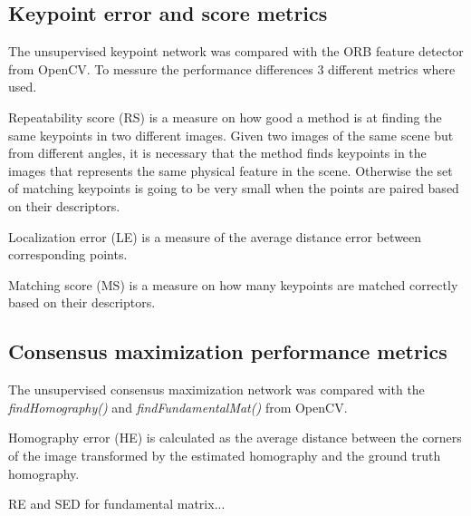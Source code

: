 \subsection{Keypoint error and score metrics}

The unsupervised keypoint network was compared with the ORB feature detector from OpenCV. To messure the performance differences 3 different metrics where used.

Repeatability score (RS) is a measure on how good a method is at finding the same keypoints in two different images. Given two images of the same scene but from different angles, it is necessary that the method finds keypoints in the images that represents the same physical feature in the scene. Otherwise the set of matching keypoints is going to be very small when the points are paired based on their descriptors.

Localization error (LE) is a measure of the average distance error between corresponding points.

Matching score (MS) is a measure on how many keypoints are matched correctly based on their descriptors.

\subsection{Consensus maximization performance metrics}

The unsupervised consensus maximization network was compared with the \textit{findHomography()} and \textit{findFundamentalMat()} from OpenCV.

Homography error (HE) is calculated as the average distance between the corners of the image transformed by the estimated homography and the ground truth homography.

RE and SED for fundamental matrix...

